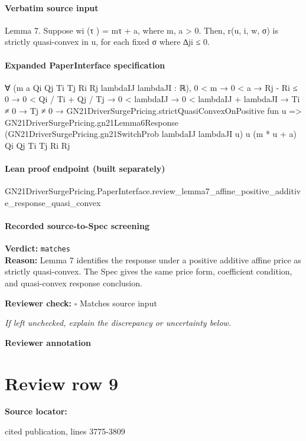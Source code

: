 \documentclass[10pt]{article}
\newcommand{\reviewerbox}{%
  \par\noindent\fbox{\parbox{0.96\linewidth}{\rule{0pt}{0.38in}}}\par
}
\newcommand{\reviewmatch}[1]{%
  \par\noindent\textbf{Reviewer check:} $\square$\; #1\par
  \noindent\emph{If left unchecked, explain the discrepancy or uncertainty below.}\par
}
\begin{document}
\paragraph{Verbatim source input}
\begin{ReviewVerbatim}
Lemma 7. Suppose wi (τ ) = mτ + a, where m, a > 0. Then, r(u, i, w, σ) is strictly quasi-convex in
u, for each fixed σ where ∆ji ≤ 0.
\end{ReviewVerbatim}


\paragraph{Expanded PaperInterface specification}
\begin{ReviewVerbatim}
∀ (m a Qi Qj Ti Tj Ri Rj lambdaIJ lambdaJI : ℝ),
  0 < m →
    0 < a →
      Rj - Ri ≤ 0 →
        0 < Qi / Ti + Qj / Tj →
          0 < lambdaIJ →
            0 < lambdaIJ + lambdaJI →
              Ti ≠ 0 →
                Tj ≠ 0 →
                  GN21DriverSurgePricing.strictQuasiConvexOnPositive fun u =>
                    GN21DriverSurgePricing.gn21Lemma6Response
                      (GN21DriverSurgePricing.gn21SwitchProb lambdaIJ lambdaJI u) u (m * u + a) Qi Qj Ti Tj Ri Rj
\end{ReviewVerbatim}

\paragraph{Lean proof endpoint (built separately)}\begin{ReviewVerbatim}
GN21DriverSurgePricing.PaperInterface.review_lemma7_affine_positive_additive_response_quasi_convex
\end{ReviewVerbatim}

\paragraph{Recorded source-to-Spec screening}
\textbf{Verdict:} \texttt{matches}
\\
\textbf{Reason:} Lemma 7 identifies the response under a positive additive affine price as strictly quasi-convex. The Spec gives the same price form, coefficient condition, and quasi-convex response conclusion.
\reviewmatch{Matches source input}
\noindent\textbf{Reviewer annotation}\par
\reviewerbox
\clearpage
\hypertarget{source-claim-72681991e4ec9e7d}{}
\section*{Review row 9}
\textbf{Source locator:} {\footnotesize\raggedright cited publication, lines 3775-\allowbreak{}3809\par}
\end{document}
